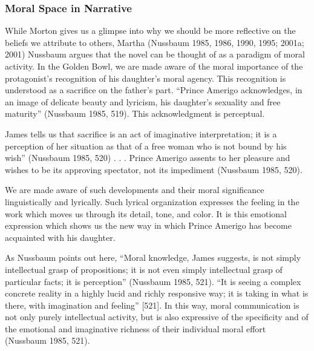 \documentclass[
  letterpaper,
  DIV=11,
  numbers=noendperiod]{scrartcl}
\theoremstyle{remark}
\begin{document}
\subsubsection{Moral Space in Narrative}\label{moral-space-in-narrative}

While Morton gives us a glimpse into why we should be more reflective on
the beliefs we attribute to others, Martha (Nussbaum 1985, 1986, 1990,
1995; 2001a; 2001) Nussbaum argues that the novel can be thought of as a
paradigm of moral activity. In the Golden Bowl, we are made aware of the
moral importance of the protagonist's recognition of his daughter's
moral agency. This recognition is understood as a sacrifice on the
father's part. ``Prince Amerigo acknowledges, in an image of delicate
beauty and lyricism, his daughter's sexuality and free maturity''
(Nussbaum 1985, 519). This acknowledgment is perceptual.

James tells us that sacrifice is an act of imaginative interpretation;
it is a perception of her situation as that of a free woman who is not
bound by his wish'' (Nussbaum 1985, 520) . . . Prince Amerigo assents to
her pleasure and wishes to be its approving spectator, not its
impediment (Nussbaum 1985, 520).

We are made aware of such developments and their moral significance
linguistically and lyrically. Such lyrical organization expresses the
feeling in the work which moves us through its detail, tone, and color.
It is this emotional expression which shows us the new way in which
Prince Amerigo has become acquainted with his daughter.

As Nussbaum points out here, ``Moral knowledge, James suggests, is not
simply intellectual grasp of propositions; it is not even simply
intellectual grasp of particular facts; it is perception'' (Nussbaum
1985, 521). ``It is seeing a complex concrete reality in a highly lucid
and richly responsive way; it is taking in what is there, with
imagination and feeling'' {[}521{]}. In this way, moral communication is
not only purely intellectual activity, but is also expressive of the
specificity and of the emotional and imaginative richness of their
individual moral effort (Nussbaum 1985, 521).
\end{document}
